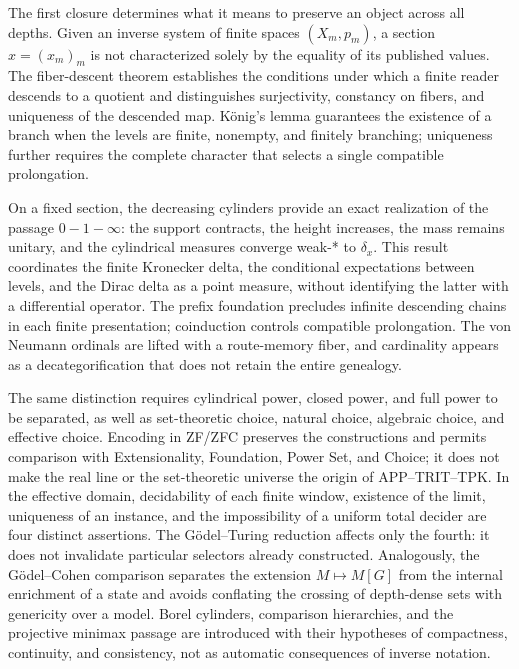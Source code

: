 The first closure determines what it means to preserve an object across all depths. Given an inverse system of finite spaces \((X_m,p_m)\), a section \(x=(x_m)_m\) is not characterized solely by the equality of its published values. The fiber-descent theorem establishes the conditions under which a finite reader descends to a quotient and distinguishes surjectivity, constancy on fibers, and uniqueness of the descended map. König's lemma guarantees the existence of a branch when the levels are finite, nonempty, and finitely branching; uniqueness further requires the complete character that selects a single compatible prolongation.

On a fixed section, the decreasing cylinders provide an exact
realization of the passage \(0\!-1\!-\!\infty\): the support contracts, the
height increases, the mass remains unitary, and the cylindrical measures
converge weak-* to \(\delta_x\). This result coordinates the finite Kronecker delta,
the conditional expectations between levels, and the Dirac delta as a point
measure, without identifying the latter with a differential operator. The
prefix foundation precludes infinite descending chains in each finite
presentation; coinduction controls compatible prolongation. The von Neumann
ordinals are lifted with a route-memory fiber, and cardinality appears as a
decategorification that does not retain the entire genealogy.

The same distinction requires cylindrical power, closed power, and
full power to be separated, as well as set-theoretic choice, natural choice,
algebraic choice, and effective choice. Encoding in ZF/ZFC preserves the
constructions and permits comparison with Extensionality, Foundation,
Power Set, and Choice; it does not make the real line or the set-theoretic universe
the origin of APP--TRIT--TPK\@. In the effective domain, decidability of each
finite window, existence of the limit, uniqueness of an instance, and the
impossibility of a uniform total decider are four distinct assertions.
The Gödel--Turing reduction affects only the fourth: it does not invalidate particular
selectors already constructed. Analogously, the Gödel--Cohen comparison separates
the extension \(M\mapsto M[G]\) from the internal enrichment of a state and
avoids conflating the crossing of depth-dense sets with genericity over a
model. Borel cylinders, comparison hierarchies, and the projective
minimax passage are introduced with their hypotheses of compactness,
continuity, and consistency, not as automatic consequences of inverse
notation.

